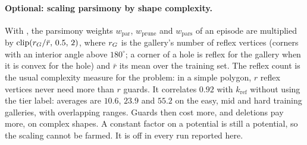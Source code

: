 \documentclass[11pt,a4paper]{article}
\begin{document}
\paragraph{Optional: scaling parsimony by shape complexity.} With
, the parsimony weights $w_{\mathrm{par}}$, $w_{\mathrm{prune}}$ and
$w_{\mathrm{pars}}$ of an episode are multiplied by $\mathrm{clip}(r_G/\bar r,\,0.5,\,2)$,
where $r_G$ is the gallery's number of reflex vertices (corners with an interior angle
above $180^\circ$; a corner of a hole is reflex for the gallery when it is convex for the hole) and $\bar r$ its mean over the
training set. The reflex count is the usual complexity measure for the problem: in a simple
polygon, $r$ reflex vertices never need more than $r$ guards. It correlates $0.92$ with $k_{\mathrm{ref}}$
without using the tier label: averages are $10.6$, $23.9$ and $55.2$ on the easy, mid and hard
training galleries, with overlapping ranges. Guards then cost more, and deletions pay more,
on complex shapes. A constant factor on a potential is still a potential, so the
scaling cannot be farmed. It is off in every run reported here.
\end{document}
